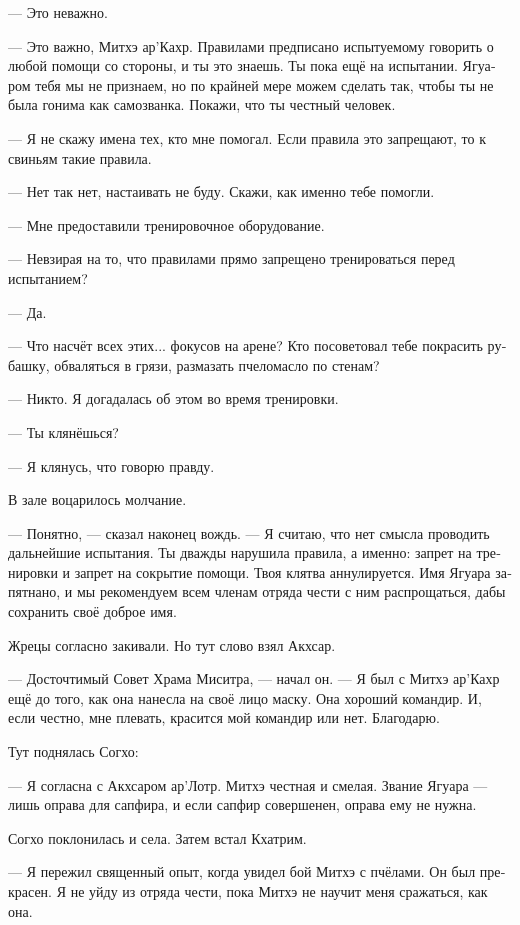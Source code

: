 \documentclass[a4paper,12pt,fleqn]{book}\usepackage{cooltooltips}\usepackage{polyglossia}\setdefaultlanguage{russian}\setotherlanguage{english}\defaultfontfeatures{Ligatures=TeX,Mapping=tex-text} \usepackage{xcolor}\definecolor{lightgray}{HTML}{bbbbbb}\color{lightgray}\newcommand{\ml}[3]{\textenglish{\textcolor{black}{#3}}}
\begin{document}
--- Это неважно.

--- Это важно, Митхэ ар'Кахр.
Правилами предписано испытуемому говорить о любой помощи со стороны, и ты это знаешь.
Ты пока ещё на испытании.
Ягуаром тебя мы не признаем, но по крайней мере можем сделать так, чтобы ты не была гонима как самозванка.
Покажи, что ты честный человек.

--- Я не скажу имена тех, кто мне помогал.
Если правила это запрещают, то к свиньям такие правила.

--- Нет так нет, настаивать не буду.
Скажи, как именно тебе помогли.

--- Мне предоставили тренировочное оборудование.

--- Невзирая на то, что правилами прямо запрещено тренироваться перед испытанием?

--- Да.

--- Что насчёт всех этих... фокусов на арене?
Кто посоветовал тебе покрасить рубашку, обваляться в грязи, размазать пчеломасло по стенам?

--- Никто.
Я догадалась об этом во время тренировки.

--- Ты клянёшься?

--- Я клянусь, что говорю правду.

В зале воцарилось молчание.

--- Понятно, --- сказал наконец вождь.
--- Я считаю, что нет смысла проводить дальнейшие испытания.
Ты дважды нарушила правила, а именно: запрет на тренировки и запрет на сокрытие помощи.
Твоя клятва аннулируется.
Имя Ягуара запятнано, и мы рекомендуем всем членам отряда чести с ним распрощаться, дабы сохранить своё доброе имя.

Жрецы согласно закивали.
Но тут слово взял Акхсар.

--- Досточтимый Совет Храма Миситра, --- начал он.
--- Я был с Митхэ ар'Кахр ещё до того, как она нанесла на своё лицо маску.
Она хороший командир.
И, если честно, мне плевать, красится мой командир или нет.
Благодарю.

Тут поднялась Согхо:

--- Я согласна с Акхсаром ар'Лотр.
Митхэ честная и смелая.
Звание Ягуара --- лишь оправа для сапфира, и если сапфир совершенен, оправа ему не нужна.

Согхо поклонилась и села.
Затем встал Кхатрим.

--- Я пережил священный опыт, когда увидел бой Митхэ с пчёлами.
Он был прекрасен.
Я не уйду из отряда чести, пока Митхэ не научит меня сражаться, как она.
\end{document}
